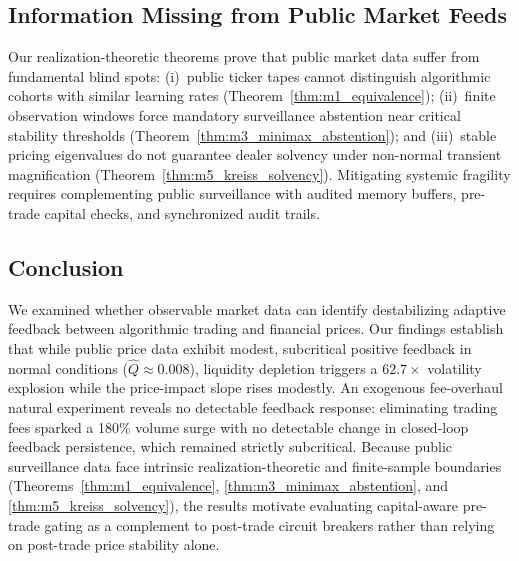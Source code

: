 \documentclass[12pt]{article}
\theoremstyle{definition}
\theoremstyle{remark}
\begin{document}
\subsection{Information Missing from Public Market Feeds}
\label{sec:missing_info}
Our realization-theoretic theorems prove that public market data suffer from fundamental blind spots: (i)~public ticker tapes cannot distinguish algorithmic cohorts with similar learning rates (Theorem~\ref{thm:m1_equivalence}); (ii)~finite observation windows force mandatory surveillance abstention near critical stability thresholds (Theorem~\ref{thm:m3_minimax_abstention}); and (iii)~stable pricing eigenvalues do not guarantee dealer solvency under non-normal transient magnification (Theorem~\ref{thm:m5_kreiss_solvency}). Mitigating systemic fragility requires complementing public surveillance with audited memory buffers, pre-trade capital checks, and synchronized audit trails.

\subsection{Conclusion}
We examined whether observable market data can identify destabilizing adaptive feedback between algorithmic trading and financial prices. Our findings establish that while public price data exhibit modest, subcritical positive feedback in normal conditions ($\hat{Q} \approx 0.008$), liquidity depletion triggers a $62.7\times$ volatility explosion while the price-impact slope rises modestly. An exogenous fee-overhaul natural experiment reveals no detectable feedback response: eliminating trading fees sparked a 180\% volume surge with no detectable change in closed-loop feedback persistence, which remained strictly subcritical. Because public surveillance data face intrinsic realization-theoretic and finite-sample boundaries (Theorems~\ref{thm:m1_equivalence}, \ref{thm:m3_minimax_abstention}, and \ref{thm:m5_kreiss_solvency}), the results motivate evaluating capital-aware pre-trade gating as a complement to post-trade circuit breakers rather than relying on post-trade price stability alone.
\end{document}
